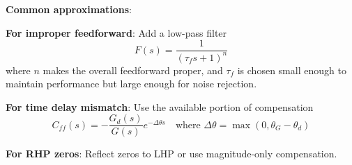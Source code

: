 \textbf{Common approximations}:

\textbf{For improper feedforward}: Add a low-pass filter
\begin{equation}
F(s) = \frac{1}{(\tau_f s + 1)^n}
\end{equation}
where $n$ makes the overall feedforward proper, and $\tau_f$ is chosen small enough to maintain performance but large enough for noise rejection.

\textbf{For time delay mismatch}: Use the available portion of compensation
\begin{equation}
C_{ff}(s) = -\frac{G_d(s)}{G(s)} e^{-\Delta\theta s} \quad \text{where } \Delta\theta = \max(0, \theta_G - \theta_d)
\end{equation}

\textbf{For RHP zeros}: Reflect zeros to LHP or use magnitude-only compensation.

